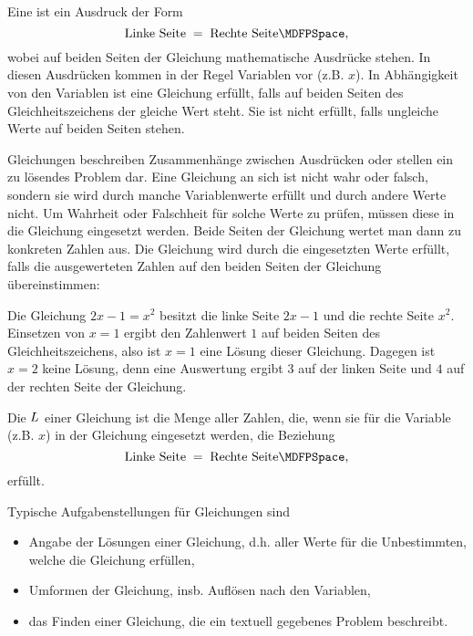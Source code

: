 \begin{MIntro}
\begin{MInfo}
Eine  ist ein Ausdruck der Form
$$
\text{Linke Seite} \;=\; \text{Rechte Seite} \MDFPSpace,
$$
wobei auf beiden Seiten der Gleichung mathematische Ausdrücke stehen. In diesen Ausdrücken kommen in der Regel Variablen vor (z.B. $x$). In Abhängigkeit von den Variablen %
ist eine Gleichung erfüllt, falls auf beiden Seiten des Gleichheitszeichens der gleiche Wert steht. Sie ist nicht erfüllt, falls ungleiche Werte auf beiden Seiten stehen.
\end{MInfo}

Gleichungen beschreiben Zusammenhänge zwischen Ausdrücken oder stellen ein zu lösendes Problem dar.
Eine Gleichung an sich ist nicht wahr oder falsch, sondern sie wird durch manche Variablenwerte erfüllt und durch andere Werte nicht.
Um Wahrheit oder Falschheit für solche Werte zu prüfen, müssen diese in die Gleichung eingesetzt werden. Beide Seiten der Gleichung wertet man dann zu konkreten Zahlen aus.
Die Gleichung wird durch die eingesetzten Werte erfüllt, falls die ausgewerteten Zahlen auf den beiden Seiten der Gleichung übereinstimmen:

\begin{MExample}
Die Gleichung $2x-1=x^2$ besitzt die linke Seite $2x-1$ und die rechte Seite $x^2$. Einsetzen von $x=1$ ergibt den Zahlenwert $1$ auf beiden Seiten des Gleichheitszeichens, also ist $x=1$ eine Lösung %
dieser Gleichung. Dagegen ist $x=2$ keine Lösung, denn eine Auswertung ergibt $3$ auf der linken Seite und $4$ auf der rechten Seite der Gleichung.%
\end{MExample}

\begin{MInfo}
Die  $L$ einer Gleichung ist die Menge aller Zahlen, die, wenn sie für die Variable (z.B. $x$) in der Gleichung eingesetzt werden, die Beziehung %
$$
\text{Linke Seite} \;=\; \text{Rechte Seite} \MDFPSpace,
$$
erfüllt.
\end{MInfo}

Typische Aufgabenstellungen für Gleichungen sind
\begin{itemize}
 \item{Angabe der Lösungen einer Gleichung, d.h. aller Werte für die Unbestimmten, welche die Gleichung erfüllen,}
 \item{Umformen der Gleichung, insb. Auflösen nach den Variablen,}
 \item{das Finden einer Gleichung, die ein textuell gegebenes Problem beschreibt.}
\end{itemize}



\end{MIntro}

